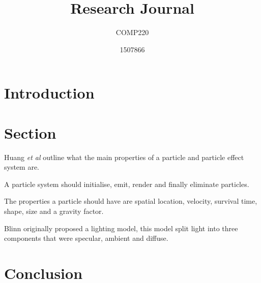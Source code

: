 \documentclass{scrartcl}
\title{Research Journal}
\subtitle{COMP220}
\author{1507866}
\begin{document}
	
\maketitle

	
\section{Introduction}
	
\section{Section}
Huang \textit{et al} outline what the main properties of a particle and particle effect system are. \cite{Huang}

A particle system should initialise, emit, render and finally eliminate particles.

The properties a particle should have are spatial location, velocity, survival  time, shape, size and a gravity factor.

\bigskip

Blinn originally proposed a lighting model, this model split light into three components that were specular, ambient and diffuse. \cite{Blinn}

	
\section{Conclusion}

	


	
\end{document}
